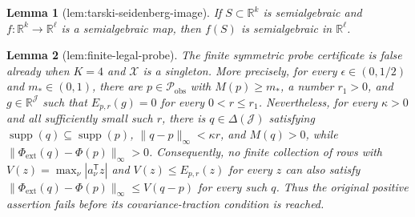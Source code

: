 \documentclass{article}
\newtheorem{lemma}{Lemma}
\begin{document}
\begin{lemma}[lem:tarski-seidenberg-image]\label{lem:tarski-seidenberg-image}
If \(S\subset\mathbb R^k\) is semialgebraic and \(f:\mathbb R^k\to\mathbb R^\ell\) is a semialgebraic map, then \(f(S)\) is semialgebraic in \(\mathbb R^\ell\).
\end{lemma}

\begin{lemma}[lem:finite-legal-probe]\label{lem:finite-legal-probe}
The finite symmetric probe certificate is false already when \(K=4\) and \(\mathcal X\) is a singleton.  More precisely, for every \(\epsilon\in(0,1/2)\) and \(m_*\in(0,1)\), there are \(p\in\mathcal P_{\mathrm{obs}}\) with \(M(p)\ge m_*\), a number \(r_1>0\), and \(g\in\mathbb R^{\mathcal J}\) such that \(E_{p,r}(g)=0\) for every \(0<r\le r_1\).  Nevertheless, for every \(\kappa>0\) and all sufficiently small such \(r\), there is \(q\in\Delta(\mathcal J)\) satisfying \(\operatorname{supp}(q)\subseteq\operatorname{supp}(p)\), \(\lVert q-p\rVert_\infty<\kappa r\), and \(M(q)>0\), while \(\lVert\Phi_{\mathrm{ext}}(q)-\Phi(p)\rVert_\infty>0\).  Consequently, no finite collection of rows with \(V(z)=\max_\nu|a_\nu^{\mathsf T}z|\) and \(V(z)\le E_{p,r}(z)\) for every \(z\) can also satisfy \(\lVert\Phi_{\mathrm{ext}}(q)-\Phi(p)\rVert_\infty\le V(q-p)\) for every such \(q\).  Thus the original positive assertion fails before its covariance-traction condition is reached.
\end{lemma}
\end{document}
